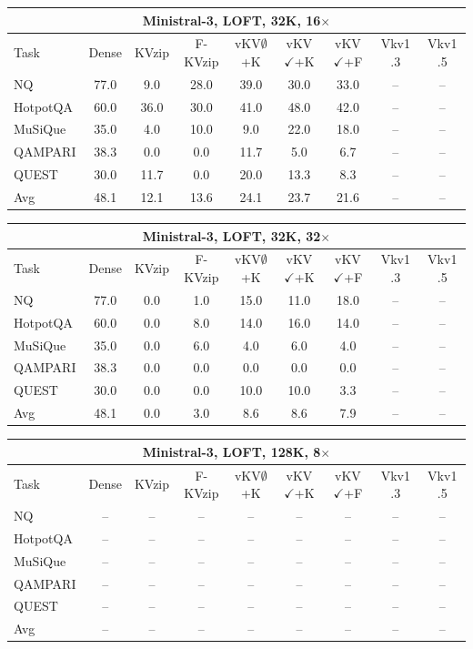 \begin{tabular}{lcccccccc}
\toprule
\multicolumn{9}{c}{Ministral-3, LOFT, 32K, 16$\times$} \\
\midrule
Task & Dense & KVzip & F-KVzip & vKV$\emptyset$+K & vKV$\checkmark$+K & vKV$\checkmark$+F & Vkv1 .3 & Vkv1 .5 \\
\midrule
NQ & 77.0 & 9.0 & 28.0 & 39.0 & 30.0 & 33.0 & -- & -- \\
HotpotQA & 60.0 & 36.0 & 30.0 & 41.0 & 48.0 & 42.0 & -- & -- \\
MuSiQue & 35.0 & 4.0 & 10.0 & 9.0 & 22.0 & 18.0 & -- & -- \\
QAMPARI & 38.3 & 0.0 & 0.0 & 11.7 & 5.0 & 6.7 & -- & -- \\
QUEST & 30.0 & 11.7 & 0.0 & 20.0 & 13.3 & 8.3 & -- & -- \\
\midrule
Avg & 48.1 & 12.1 & 13.6 & 24.1 & 23.7 & 21.6 & -- & -- \\
\bottomrule
\end{tabular}
\vspace{0.8em}

\begin{tabular}{lcccccccc}
\toprule
\multicolumn{9}{c}{Ministral-3, LOFT, 32K, 32$\times$} \\
\midrule
Task & Dense & KVzip & F-KVzip & vKV$\emptyset$+K & vKV$\checkmark$+K & vKV$\checkmark$+F & Vkv1 .3 & Vkv1 .5 \\
\midrule
NQ & 77.0 & 0.0 & 1.0 & 15.0 & 11.0 & 18.0 & -- & -- \\
HotpotQA & 60.0 & 0.0 & 8.0 & 14.0 & 16.0 & 14.0 & -- & -- \\
MuSiQue & 35.0 & 0.0 & 6.0 & 4.0 & 6.0 & 4.0 & -- & -- \\
QAMPARI & 38.3 & 0.0 & 0.0 & 0.0 & 0.0 & 0.0 & -- & -- \\
QUEST & 30.0 & 0.0 & 0.0 & 10.0 & 10.0 & 3.3 & -- & -- \\
\midrule
Avg & 48.1 & 0.0 & 3.0 & 8.6 & 8.6 & 7.9 & -- & -- \\
\bottomrule
\end{tabular}
\vspace{0.8em}

\begin{tabular}{lcccccccc}
\toprule
\multicolumn{9}{c}{Ministral-3, LOFT, 128K, 8$\times$} \\
\midrule
Task & Dense & KVzip & F-KVzip & vKV$\emptyset$+K & vKV$\checkmark$+K & vKV$\checkmark$+F & Vkv1 .3 & Vkv1 .5 \\
\midrule
NQ & -- & -- & -- & -- & -- & -- & -- & -- \\
HotpotQA & -- & -- & -- & -- & -- & -- & -- & -- \\
MuSiQue & -- & -- & -- & -- & -- & -- & -- & -- \\
QAMPARI & -- & -- & -- & -- & -- & -- & -- & -- \\
QUEST & -- & -- & -- & -- & -- & -- & -- & -- \\
\midrule
Avg & -- & -- & -- & -- & -- & -- & -- & -- \\
\bottomrule
\end{tabular}
\vspace{0.8em}

